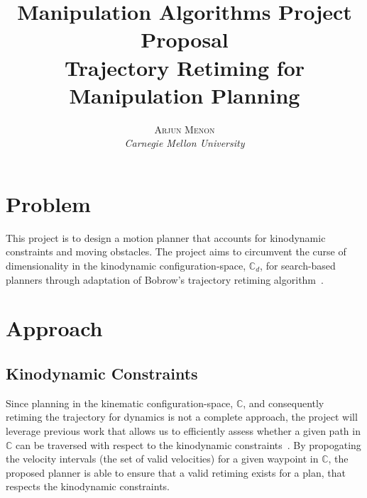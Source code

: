\documentclass[letterpaper,10pt]{article} %
\title{\textbf{Manipulation Algorithms Project Proposal}\\ %
Trajectory Retiming for Manipulation Planning} %
\author{\textsc{Arjun Menon} %
\\{\textit{Carnegie Mellon University}}} %
\makeatletter
\renewcommand{\maketitle}{ %
\begin{flushright} %
{\LARGE\@title} %

\vspace{5pt} %

{\large\@author} %
\vspace{0pt} %
\end{flushright}
}
\makeatother
\begin{document}
\maketitle %



%
%
%


\section{Problem}

This project is to design a motion planner that accounts for kinodynamic constraints and moving obstacles. The project aims to circumvent the curse of dimensionality in the kinodynamic configuration-space, $\mathbb{C}_d$, for search-based planners through adaptation of Bobrow's trajectory retiming algorithm~\cite{bobrow1985time}.

\section{Approach}\label{sec:approach}

\subsection{Kinodynamic Constraints}\label{sec:constraints}

Since planning in the kinematic configuration-space, $\mathbb{C}$, and consequently retiming the trajectory for dynamics is not a complete approach, the project will leverage previous work that allows us to efficiently assess whether a given path in $\mathbb{C}$ can be traversed with respect to the kinodynamic constraints~\cite{pham2013velocity}. By propogating the velocity intervals (the set of valid velocities) for a given waypoint in $\mathbb{C}$, the proposed planner is able to ensure that a valid retiming exists for a plan, that respects the kinodynamic constraints.
\end{document}
